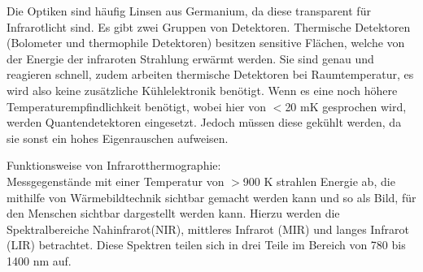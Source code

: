 Die Optiken sind häufig Linsen aus Germanium, da diese transparent für Infrarotlicht sind. Es
gibt zwei Gruppen von Detektoren. Thermische Detektoren (Bolometer und
thermophile Detektoren) besitzen sensitive Flächen, welche von der Energie der
infraroten Strahlung erwärmt werden. Sie sind genau und reagieren schnell,
zudem arbeiten thermische Detektoren bei Raumtemperatur, es wird also keine
zusätzliche Kühlelektronik benötigt. Wenn es eine noch höhere
Temperaturempfindlichkeit benötigt, wobei hier von $<$20 mK gesprochen wird, werden
Quantendetektoren eingesetzt. Jedoch müssen diese gekühlt werden, da sie sonst ein hohes
Eigenrauschen aufweisen.\cite{may2015transiente}

Funktionsweise von Infrarotthermographie: \\ Messgegenstände mit einer
Temperatur von $>$900 K strahlen Energie ab, die mithilfe von
Wärmebildtechnik sichtbar gemacht werden kann und so als Bild, für den Menschen
sichtbar dargestellt werden kann. Hierzu werden die Spektralbereiche
Nahinfrarot(NIR), mittleres Infrarot (MIR) und langes Infrarot (LIR)
betrachtet. Diese Spektren teilen sich in drei Teile im Bereich von 780 bis
1400 nm auf.\cite{schuster2004infrarotthermographie}
